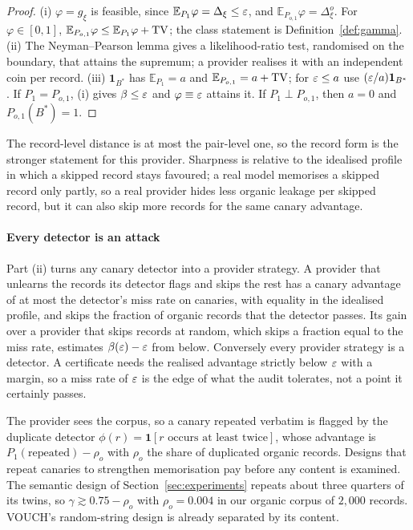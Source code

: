 \begin{proof}
(i) $\varphi=g_\xi$ is feasible, since $\mathbb{E}_{P_1}\varphi=\Delta_\xi\le\varepsilon$, and
$\mathbb{E}_{P_{o,1}}\varphi=\Delta^o_\xi$. For $\varphi\in[0,1]$,
$\mathbb{E}_{P_{o,1}}\varphi\le\mathbb{E}_{P_1}\varphi+\mathrm{TV}$; the class statement is
Definition~\ref{def:gamma}. (ii) The Neyman--Pearson lemma \citep{neyman1933efficient} gives a
likelihood-ratio test, randomised on the boundary, that attains the supremum; a provider
realises it with an independent coin per record. (iii) $\mathbf 1_{B^\ast}$ has
$\mathbb{E}_{P_1}=a$ and $\mathbb{E}_{P_{o,1}}=a+\mathrm{TV}$; for $\varepsilon\le a$ use $(\varepsilon/a)\mathbf
1_{B^\ast}$. If $P_1=P_{o,1}$, (i) gives $\beta\le\varepsilon$ and $\varphi\equiv\varepsilon$ attains it. If
$P_1\perp P_{o,1}$, then $a=0$ and $P_{o,1}(B^\ast)=1$.
\end{proof}

The record-level distance is at most the pair-level one, so the record form is the stronger
statement for this provider. Sharpness is relative to the idealised profile in which a
skipped record stays favoured; a real model memorises a skipped record only partly, so a real
provider hides less organic leakage per skipped record, but it can also skip more records for
the same canary advantage.

\paragraph{Every detector is an attack} Part (ii) turns any canary detector into a provider
strategy. A provider that unlearns the records its detector flags and skips the rest has a
canary advantage of at most the detector's miss rate on canaries, with equality in the
idealised profile, and skips the fraction of organic records that the detector passes. Its
gain over a provider that skips records at random, which skips a fraction equal to the miss
rate, estimates $\beta(\varepsilon)-\varepsilon$ from below. Conversely every provider strategy is a
detector. A certificate needs the realised advantage strictly below $\varepsilon$ with a margin, so
a miss rate of $\varepsilon$ is the edge of what the audit tolerates, not a point it certainly
passes.

\begin{remark}\label{rem:dup}
The provider sees the corpus, so a canary repeated verbatim is flagged by the duplicate
detector $\phi(r)=\mathbf 1[r\text{ occurs at least twice}]$, whose advantage is
$P_1(\text{repeated})-\rho_o$ with $\rho_o$ the share of duplicated organic records. Designs
that repeat canaries to strengthen memorisation pay before any content is examined. The
semantic design of Section~\ref{sec:experiments} repeats about three quarters of its twins,
so $\gamma\gtrsim0.75-\rho_o$ with $\rho_o=0.004$ in our organic corpus of $2{,}000$ records.
VOUCH's random-string design is already separated by its content.
\end{remark}

